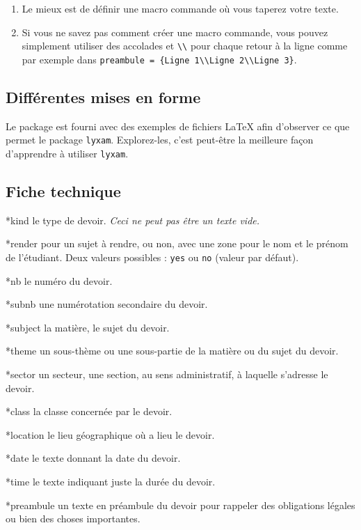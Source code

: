 \documentclass[12pt,a4paper]{article}
\makeatletter
\theoremstyle{definition}
\newcommand\IDmacro{\@ifstar{\@IDmacroStar}{\@IDmacroNoStar}}
\newcommand\@IDmacroNoStar[3]{%
        \texttt{%
        	\textbackslash#1%
        	\IfStrEq{#2}{0}{}{%
        		\,\,[#2 Option%
				\IfStrEq{#2}{1}{}{s}]%
			}%
    	    \IfStrEq{#3}{0}{}{%
	    		\,\,(#3 Argument%
				\IfStrEq{#3}{1}{}{s})%
			}
	   	}
        \immediate\write\tempfile{macro@#1@#2@#3}%
    }
\newcommand\@IDmacroStar[2]{%
        \@IDmacroNoStar{#1}{0}{#2}%
    }
\newcommand\@IDoptarg{\@ifstar{\@IDoptargStar}{\@IDoptargNoStar}}
\newcommand\@IDoptargStar[2]{%
    	\vspace{0.5em}
		--- \texttt{#1%
			\IfStrEq{#2}{}{:}{\,#2:}%
		}%
	}
\newcommand\@IDoptargNoStar[2]{%
    	\IfStrEq{#2}{}{%
			\@IDoptargStar{#1}{}%
		}{%
			\@IDoptargStar{#1}{\##2}%
		}%
	}
\newcommand\IDoption{\@ifstar{\@IDoptionStar}{\@IDoptionNoStar}}
\newcommand\@IDoptionStar[1]{%
    	\@IDoptarg*{Option}{{\itshape "#1"}}%
	}
\newcommand\@IDoptionNoStar[1]{%
    	\@IDoptarg{Option}{#1}%
	}
\makeatother
\begin{document}
\begin{enumerate}
	 \begin{enumerate}
		\item Le mieux est de définir une macro commande où vous taperez votre texte.

		\item Si vous ne savez pas comment créer une macro commande, vous pouvez simplement utiliser des accolades et \verb+\\+ pour chaque retour à la ligne comme par exemple dans \verb+preambule = {Ligne 1\\Ligne 2\\Ligne 3}+.
	\end{enumerate}
\end{enumerate}


	\subsection{Différentes mises en forme}

Le package est fourni avec des exemples de fichiers \LaTeX{} afin d'observer ce que permet le package \verb+lyxam+. Explorez-les, c'est peut-être la meilleure façon d'apprendre à utiliser \verb+lyxam+.


	\subsection{Fiche technique}

\IDmacro{exam}{12}{0}

\IDoption*{kind} le type de devoir. \emph{Ceci ne peut pas être un texte vide.}

\IDoption*{render} pour un sujet à rendre, ou non, avec une zone pour le nom et le prénom de l'étudiant. Deux valeurs possibles : \verb+yes+ ou \verb+no+ (valeur par défaut).

\IDoption*{nb} le numéro du devoir.

\IDoption*{subnb} une numérotation secondaire du devoir.

\IDoption*{subject} la matière, le sujet du devoir.

\IDoption*{theme} un sous-thème ou une sous-partie de la matière ou du sujet du devoir. 

\IDoption*{sector} un secteur, une section, au sens administratif, à laquelle s'adresse le devoir.

\IDoption*{class} la classe concernée par le devoir.

\IDoption*{location} le lieu géographique où a lieu le devoir.

\IDoption*{date} le texte donnant la date du devoir.

\IDoption*{time} le texte indiquant juste la durée du devoir.

\IDoption*{preambule} un texte en préambule du devoir pour rappeler des obligations légales ou bien des choses importantes.
\end{document}
